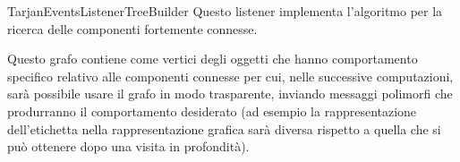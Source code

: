 \begin{paragraph}{TarjanEventsListenerTreeBuilder}
  Questo listener implementa l'algoritmo per la ricerca delle
  componenti fortemente connesse.

  Questo grafo contiene come vertici degli oggetti che hanno
  comportamento specifico relativo alle componenti connesse per cui,
  nelle successive computazioni, sar\`a possibile usare il grafo in
  modo trasparente, inviando messaggi polimorfi che produrranno il
  comportamento desiderato (ad esempio la rappresentazione
  dell'etichetta nella rappresentazione grafica sar\`a diversa
  rispetto a quella che si pu\`o ottenere dopo una visita in
  profondit\`a).
\end{paragraph}



